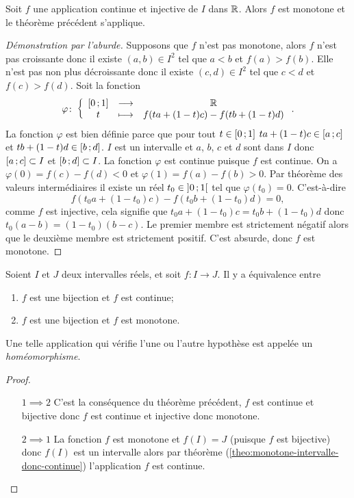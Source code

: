 \begin{theo}
  Soit \(f\) une application continue et injective de \(I\) dans \(\mathbb{R}\). Alors \(f\) est monotone et le théorème précédent s'applique.
\end{theo}
\begin{proof}[Démonstration par l'aburde]
  Supposons que \(f\) n'est pas monotone, alors \(f\) n'est pas croissante donc il existe \((a,b) \in I^2\) tel que \(a < b\) et \(f(a) > f(b)\). Elle n'est pas non plus décroissante donc il existe \((c,d) \in I^2\) tel que \(c < d\) et \(f(c) > f(d)\). Soit la fonction
  \begin{equation}
    \varphi\colon \left\{\begin{array}{ccc} \left[ 0 \, ;  1 \right] & \longrightarrow &\mathbb{R}\\ t & \longmapsto & f(ta+(1-t)c)-f(tb+(1-t)d) \end{array} \right..
  \end{equation}
  La fonction \(\varphi\) est bien définie parce que pour tout \(t \in \left[ 0 \, ;  1 \right]\) \(ta+(1-t)c \in \left[ a \, ;  c \right]\) et \(tb+(1-t)d \in \left[ b \, ;  d \right]\). \(I\) est un intervalle et \(a\), \(b\), \(c\) et \(d\) sont dans \(I\) donc \(\left[ a \, ;  c \right] \subset I\) et \(\left[ b \, ;  d \right] \subset I\). La fonction \(\varphi\) est continue puisque \(f\) est continue. On a \(\varphi(0)=f(c)-f(d) <0\) et \(\varphi(1)=f(a)-f(b) >0\). Par théorème des valeurs intermédiaires il existe un réel \(t_0 \in \left] 0 \, ;  1 \right[\) tel que \(\varphi(t_0)=0\). C'est-à-dire
\begin{equation}
  f(t_0a+(1-t_0)c)-f(t_0b+(1-t_0)d)=0,
\end{equation}
comme \(f\) est injective, cela signifie que \(t_0a+(1-t_0)c=t_0b+(1-t_0)d\) donc \(t_0(a-b)=(1-t_0)(b-c)\). Le premier membre est strictement négatif alors que le deuxième membre est strictement positif. C'est absurde, donc \(f\) est monotone.
\end{proof}
\begin{cor}
  Soient \(I\) et \(J\) deux intervalles réels, et soit \(f:I\longrightarrow J\). Il y a équivalence entre
  \begin{enumerate}
  \item \(f\) est une bijection et \(f\) est continue;
  \item \(f\) est une bijection et \(f\) est monotone.
  \end{enumerate}
  Une telle application qui vérifie l'une ou l'autre hypothèse est appelée un \emph{homéomorphisme}.
\end{cor}
\begin{proof}
  \begin{itemize}
  \item[\(1 \implies 2\)] C'est la conséquence du théorème précédent, \(f\) est continue et bijective donc \(f\) est continue et injective donc monotone.
  \item[\(2 \implies 1\)] La fonction \(f\) est monotone et \(f(I)=J\) (puisque \(f\) est bijective) donc \(f(I)\) est un intervalle alors par théorème (\ref{theo:monotone-intervalle-donc-continue}) l'application \(f\) est continue.
  \end{itemize}
\end{proof}

